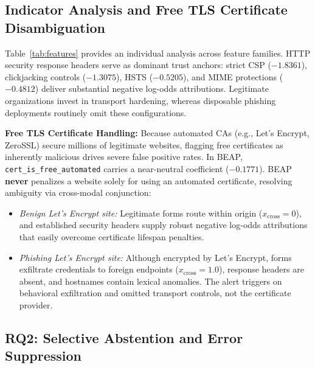 \documentclass{llncs}
\begin{document}
\subsection{Indicator Analysis and Free TLS Certificate Disambiguation}

Table~\ref{tab:features} provides an individual analysis across feature families. HTTP security response headers serve as dominant trust anchors: strict CSP ($-1.8361$), clickjacking controls ($-1.3075$), HSTS ($-0.5205$), and MIME protections ($-0.4812$) deliver substantial negative log-odds attributions. Legitimate organizations invest in transport hardening, whereas disposable phishing deployments routinely omit these configurations.

\textbf{Free TLS Certificate Handling:} Because automated CAs (e.g., Let's Encrypt, ZeroSSL) secure millions of legitimate websites, flagging free certificates as inherently malicious drives severe false positive rates. In BEAP, \texttt{cert\_is\_free\_automated} carries a near-neutral coefficient ($-0.1771$). BEAP \textbf{never} penalizes a website solely for using an automated certificate, resolving ambiguity via cross-modal conjunction:
\begin{itemize}[leftmargin=1.5em]
    \item \textit{Benign Let's Encrypt site:} Legitimate forms route within origin ($x_{\text{cross}}=0$), and established security headers supply robust negative log-odds attributions that easily overcome certificate lifespan penalties.
    \item \textit{Phishing Let's Encrypt site:} Although encrypted by Let's Encrypt, forms exfiltrate credentials to foreign endpoints ($x_{\text{cross}}=1.0$), response headers are absent, and hostnames contain lexical anomalies. The alert triggers on behavioral exfiltration and omitted transport controls, not the certificate provider.
\end{itemize}

\subsection{RQ2: Selective Abstention and Error Suppression}
\end{document}
